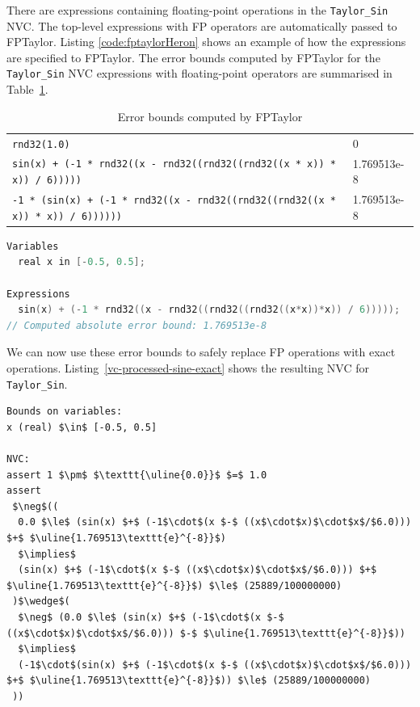 \documentclass[runningheads]{llncs}
\begin{document}
There are expressions containing floating-point operations in the \lstinline{Taylor_Sin} NVC. 
The top-level expressions with FP operators are automatically passed to FPTaylor. 
Listing \ref{code:fptaylorHeron} shows an example of how the expressions are specified to FPTaylor.
The error bounds computed by FPTaylor for the \lstinline{Taylor_Sin} NVC expressions with floating-point operators are summarised in Table~\ref{table:rounding-errors}.

\begin{table}[ht]
\begin{center}
  \begin{tabular}{l@{\kern 1em}l}
    \toprule
    \fontsize{7}{10pt}\selectfont
    \texttt{rnd32(1.0)}                                                                   & 0 \\
    \fontsize{7}{10pt}\selectfont
    \texttt{sin(x) + (-1 * rnd32((x - rnd32((rnd32((rnd32((x * x)) * x)) / 6)))))}        & 1.769513e-8 \\
    \fontsize{7}{10pt}\selectfont
    \texttt{-1 * (sin(x) + (-1 * rnd32((x - rnd32((rnd32((rnd32((x * x)) * x)) / 6))))))} & 1.769513e-8 \\
    \bottomrule
  \end{tabular}
\end{center}
\caption{Error bounds computed by FPTaylor}\label{table:rounding-errors}
\end{table}

\begin{lstlisting}[float=t,caption=FPTaylor file to compute an error bound of the \lstinline{Taylor_Sin} VC,label={code:fptaylorHeron}, language=C]
Variables
  real x in [-0.5, 0.5];

Expressions
  sin(x) + (-1 * rnd32((x - rnd32((rnd32((rnd32((x*x))*x)) / 6)))));
// Computed absolute error bound: 1.769513e-8
\end{lstlisting}

We can now use these error bounds to safely replace FP operations with exact operations. 
Listing~\ref{vc-processed-sine-exact} shows the resulting NVC for \lstinline{Taylor_Sin}.

\begin{lstlisting}[float=t,caption={\lstinline{Taylor_Sin} NVC after removal of FP operations}, label=vc-processed-sine-exact,basicstyle=\fontsize{7.5}{9pt}\tt]
Bounds on variables:
x (real) $\in$ [-0.5, 0.5] 

NVC: 
assert 1 $\pm$ $\texttt{\uline{0.0}}$ $=$ 1.0 
assert
 $\neg$((
  0.0 $\le$ (sin(x) $+$ (-1$\cdot$(x $-$ ((x$\cdot$x)$\cdot$x$/$6.0))) $+$ $\uline{1.769513\texttt{e}^{-8}}$)
  $\implies$
  (sin(x) $+$ (-1$\cdot$(x $-$ ((x$\cdot$x)$\cdot$x$/$6.0))) $+$ $\uline{1.769513\texttt{e}^{-8}}$) $\le$ (25889/100000000) 
 )$\wedge$(
  $\neg$ (0.0 $\le$ (sin(x) $+$ (-1$\cdot$(x $-$ ((x$\cdot$x)$\cdot$x$/$6.0))) $-$ $\uline{1.769513\texttt{e}^{-8}}$)) 
  $\implies$
  (-1$\cdot$(sin(x) $+$ (-1$\cdot$(x $-$ ((x$\cdot$x)$\cdot$x$/$6.0))) $+$ $\uline{1.769513\texttt{e}^{-8}}$)) $\le$ (25889/100000000)
 ))
\end{lstlisting}
\end{document}
